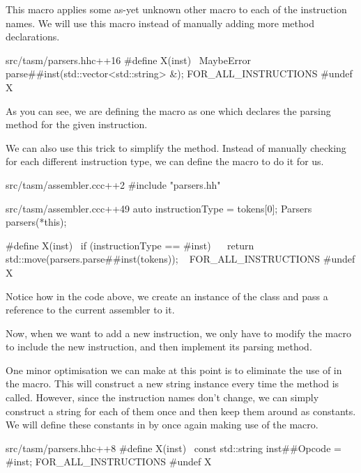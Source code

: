 This macro applies some as-yet unknown other macro  to each of the instruction names. We will use this macro instead of manually adding more method declarations.

\begin{file}{src/tasm/parsers.hh}{c++}{16}
#define X(inst) \
    MaybeError parse##inst(std::vector<std::string> &);
    FOR_ALL_INSTRUCTIONS
#undef X
\end{file}

As you can see, we are defining the  macro as one which declares the parsing method for the given instruction.

We can also use this trick to simplify the  method. Instead of manually checking for each different instruction type, we can define the  macro to do it for us.

\begin{file}{src/tasm/assembler.cc}{c++}{2}
#include "parsers.hh"
\end{file}

\begin{file}{src/tasm/assembler.cc}{c++}{49}
    auto instructionType = tokens[0];
    Parsers parsers(*this);

#define X(inst)                                        \
    if (instructionType == #inst)                      \
    {                                                  \
        return std::move(parsers.parse##inst(tokens)); \
    }
    FOR_ALL_INSTRUCTIONS
#undef X
\end{file}

Notice how in the code above, we create an instance of the  class and pass a reference to the current assembler to it.

Now, when we want to add a new instruction, we only have to modify the  macro to include the new instruction, and then implement its parsing method.

One minor optimisation we can make at this point is to eliminate the use of  in the  macro. This will construct a new string instance every time the  method is called. However, since the instruction names don't change, we can simply construct a string for each of them once and then keep them around as constants. We will define these constants in  by once again making use of the  macro.

\begin{file}{src/tasm/parsers.hh}{c++}{8}
#define X(inst) \
    const std::string inst##Opcode = #inst;
FOR_ALL_INSTRUCTIONS
#undef X
\end{file}

